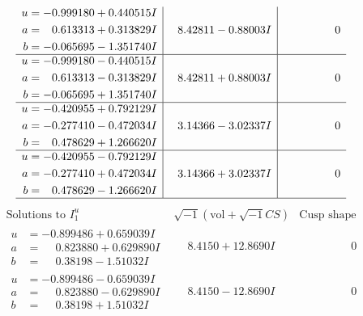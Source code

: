 \documentclass[1p]{elsarticle_modified}
\theoremstyle{definition}
\newcommand{\I}{\sqrt{-1}}
\begin{document}
$$\begin{array}{c|c|c}
\begin{aligned}
u &= -0.999180 + 0.440515 I \\
a &= \phantom{-}0.613313 + 0.313829 I \\
b &= -0.065695 - 1.351740 I\end{aligned}
 & \phantom{-}8.42811 - 0.88003 I & \phantom{-0.000000 } 0 \\ \hline\begin{aligned}
u &= -0.999180 - 0.440515 I \\
a &= \phantom{-}0.613313 - 0.313829 I \\
b &= -0.065695 + 1.351740 I\end{aligned}
 & \phantom{-}8.42811 + 0.88003 I & \phantom{-0.000000 } 0 \\ \hline\begin{aligned}
u &= -0.420955 + 0.792129 I \\
a &= -0.277410 - 0.472034 I \\
b &= \phantom{-}0.478629 + 1.266620 I\end{aligned}
 & \phantom{-}3.14366 - 3.02337 I & \phantom{-0.000000 } 0 \\ \hline\begin{aligned}
u &= -0.420955 - 0.792129 I \\
a &= -0.277410 + 0.472034 I \\
b &= \phantom{-}0.478629 - 1.266620 I\end{aligned}
 & \phantom{-}3.14366 + 3.02337 I & \phantom{-0.000000 } 0\\
 \hline 
 \end{array}$$\newpage$$\begin{array}{c|c|c}  
\text{Solutions to }I^u_{1}& \I (\text{vol} + \sqrt{-1}CS) & \text{Cusp shape}\\
 \hline 
\begin{aligned}
u &= -0.899486 + 0.659039 I \\
a &= \phantom{-}0.823880 + 0.629890 I \\
b &= \phantom{-}0.38198 - 1.51032 I\end{aligned}
 & \phantom{-}8.4150 + 12.8690 I & \phantom{-0.000000 } 0 \\ \hline\begin{aligned}
u &= -0.899486 - 0.659039 I \\
a &= \phantom{-}0.823880 - 0.629890 I \\
b &= \phantom{-}0.38198 + 1.51032 I\end{aligned}
 & \phantom{-}8.4150 - 12.8690 I & \phantom{-0.000000 } 0 \\ \hline\begin{aligned}

\end{aligned}
\end{array}$$
\end{document}
